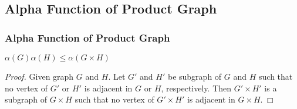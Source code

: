 \subsection{Alpha Function of Product Graph}

\begin{frame}
      \frametitle{Alpha Function of Product Graph}
      \begin{lemma}
            $\alpha(G)\alpha(H) \leq \alpha(G \times H)$
      \end{lemma}

      \pause

      \begin{proof}
            Given graph $ G $ and $ H $. Let $ G' $ and $ H' $ be subgraph of $ G $ and $ H $ such that no vertex of $ G' $ or $ H' $ is adjacent in $ G $ or $ H $, respectively. Then $ G' \times H' $ is a subgraph of $ G \times H $ such that no vertex of $ G' \times H' $ is adjacent in $ G \times H $.
      \end{proof}
\end{frame}
